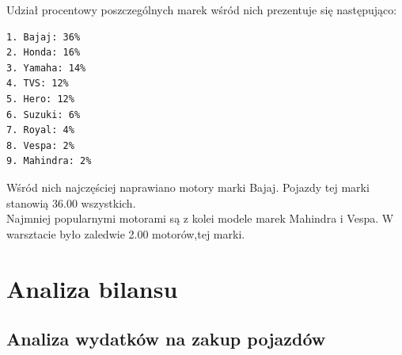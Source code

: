 \documentclass{article}\usepackage[]{graphicx}\usepackage[]{xcolor}
\begin{document}
Udział procentowy poszczególnych marek wśród nich prezentuje się następująco:

\begin{verbatim}
1. Bajaj: 36%
2. Honda: 16%
3. Yamaha: 14%
4. TVS: 12%
5. Hero: 12%
6. Suzuki: 6%
7. Royal: 4%
8. Vespa: 2%
9. Mahindra: 2%
\end{verbatim}

Wśród nich najczęściej naprawiano motory marki Bajaj. Pojazdy tej marki stanowią 36.00 wszystkich. \\

Najmniej popularnymi motorami są z kolei modele marek Mahindra i Vespa. W warsztacie było zaledwie 2.00 motorów,tej marki.


\section{Analiza bilansu}

\subsection{Analiza wydatków na zakup pojazdów}
\end{document}
